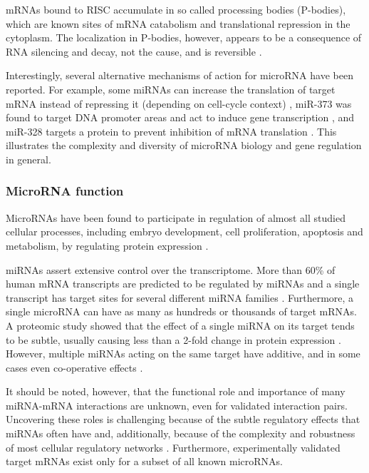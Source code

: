 mRNAs bound to RISC accumulate in so called processing bodies (P-bodies),
which are known sites of mRNA catabolism and translational repression in the
cytoplasm. The localization in P-bodies, however, appears to be a consequence
of RNA silencing and decay, not the cause, and is reversible 
\citep{Eulalio2007}.

Interestingly, several alternative mechanisms of action for microRNA have been
reported. For example, some miRNAs can increase the translation of target mRNA instead of
repressing it (depending on cell-cycle context) \citep{Vasudevan2007}, miR-373
was found to target DNA promoter areas and act to induce gene transcription
\citep{Place2008}, and miR-328 targets a protein to prevent inhibition of mRNA
translation \citep{Eiring2010}. This illustrates the complexity and diversity of
microRNA biology and gene regulation in general.






\subsubsection{MicroRNA function}\label{microrna-function}

MicroRNAs have been found to participate in regulation of almost all studied
cellular processes, including embryo development, cell proliferation,
apoptosis and metabolism, by regulating protein expression \cite{}.

miRNAs assert extensive control over the transcriptome. More than 60\% of
human mRNA transcripts are predicted to be regulated by miRNAs and a single
transcript has target sites for several different miRNA families
\citep{Friedman2009}. Furthermore, a single microRNA can have as many as hundreds or
thousands of target mRNAs. A proteomic study showed that the effect of a
single miRNA on its target tends to be subtle, usually causing less than a
2-fold change in protein expression \citep{Baek2008}. However, multiple miRNAs
acting on the same target have additive, and in some cases even co-operative
effects \citep{Bartel2009}.



It should be noted, however, that the functional role and importance of many
miRNA-mRNA interactions are unknown, even for validated interaction pairs.
Uncovering these roles is challenging because of the subtle regulatory effects
that miRNAs often have and, additionally, because of the complexity and
robustness of most cellular regulatory networks \citep{Bartel2009}.
Furthermore, experimentally validated target mRNAs exist only for a subset of
all known microRNAs.

